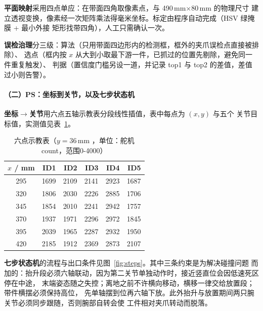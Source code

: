 \documentclass[UTF8,a4paper,zihao=5,fontset=windows]{ctexart}
\begin{document}
\textbf{平面映射}采用四点单应：在带面四角取像素点，与 490\,mm$\times$80\,mm 的物理尺寸
建立透视变换，像素经一次矩阵乘法得毫米坐标。标定由程序自动完成（HSV 绿掩膜 + 最小外接
矩形找带四角），人工只需确认一次。

\textbf{误检治理}分三级：算法（只用带面四边形内的检测框，框外的夹爪误检点直接被排除）、
选点（框内按 $x$ 从大到小取最下游一件，已抓过的位置先剔除，避免同一件重复触发）、
判据（置信度门槛另设一道，并记录 top1 与 top2 的差值，差值过小则告警）。

\paragraph{（二）PS：坐标到关节，以及七步状态机}

\textbf{坐标$\rightarrow$关节}用六点五轴示教表分段线性插值，表中每点为 $(x,y)$ 与五个
关节目标值，实测值见表~\ref{tab:teach}。

\begin{table}[H]\centering\small
\caption{六点示教表（$y=36$\,mm ，单位：舵机 count，范围0-4000）}
\label{tab:teach}
\begin{tabular}{@{}crrrrr@{}}
\toprule
$x$ / mm & ID1 & ID2 & ID3 & ID4 & ID5 \\
\midrule
295 & 1699 & 2109 & 2141 & 2923 & 1687 \\
320 & 1806 & 2030 & 2226 & 2885 & 1706 \\
345 & 1854 & 2010 & 2241 & 2942 & 1757 \\
370 & 1937 & 1971 & 2296 & 2972 & 1845 \\
395 & 2039 & 1965 & 2287 & 2932 & 1950 \\
420 & 2185 & 1912 & 2369 & 2873 & 2107 \\
\bottomrule
\end{tabular}
\end{table}

\textbf{七步状态机}的流程与出口条件见图~\ref{fig:steps}。其中三条约束是为解决碰撞问题
而加的：抬升段必须六轴联动，因为第二关节单独动作时，接近竖直位会因低速死区停在中途，
末端姿态随之失控；离地之前不许横向移动，横移一律交给放置段；带件横摆必须保持高位，
先单轴摆到位再六轴下放。此外抬升与放置期间两只腕关节必须同步跟随，否则腕部自转会使
工件相对夹爪转动而脱落。
\end{document}
